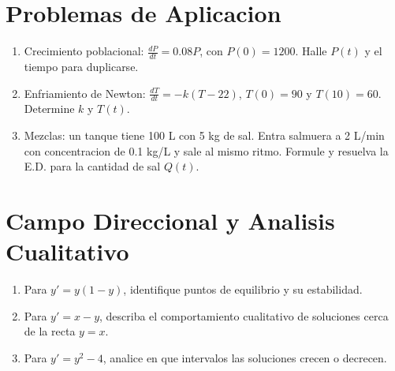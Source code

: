\documentclass[12pt,a4paper]{article}
\begin{document}
\section{Problemas de Aplicacion}

\begin{enumerate}
    \item Crecimiento poblacional: $\frac{dP}{dt}=0.08P$, con $P(0)=1200$. Halle $P(t)$ y el tiempo para duplicarse.
    \item Enfriamiento de Newton: $\frac{dT}{dt}=-k(T-22)$, $T(0)=90$ y $T(10)=60$. Determine $k$ y $T(t)$.
    \item Mezclas: un tanque tiene 100 L con 5 kg de sal. Entra salmuera a 2 L/min con concentracion de 0.1 kg/L y sale al mismo ritmo. Formule y resuelva la E.D. para la cantidad de sal $Q(t)$.
\end{enumerate}

\section{Campo Direccional y Analisis Cualitativo}

\begin{enumerate}
    \item Para $y'=y(1-y)$, identifique puntos de equilibrio y su estabilidad.
    \item Para $y'=x-y$, describa el comportamiento cualitativo de soluciones cerca de la recta $y=x$.
    \item Para $y'=y^2-4$, analice en que intervalos las soluciones crecen o decrecen.
\end{enumerate}
\end{document}
